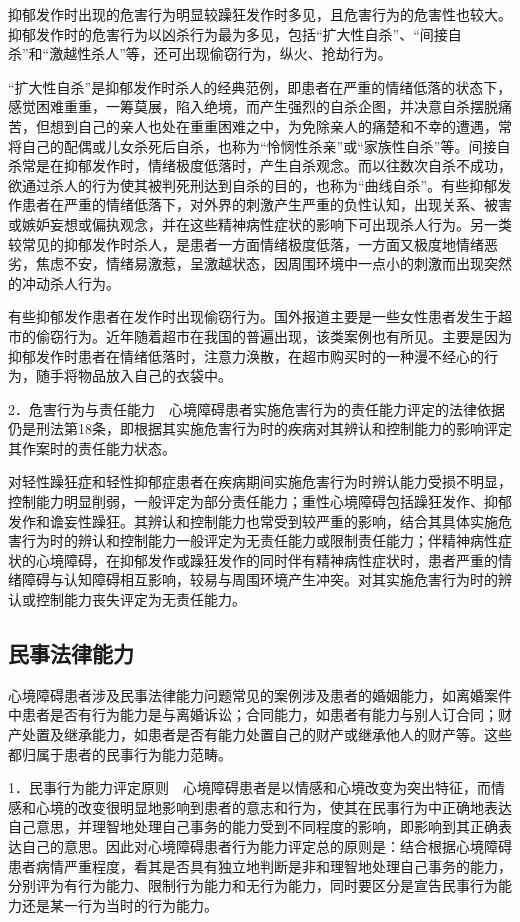 抑郁发作时出现的危害行为明显较躁狂发作时多见，且危害行为的危害性也较大。抑郁发作时的危害行为以凶杀行为最为多见，包括“扩大性自杀”、“间接自杀”和“激越性杀人”等，还可出现偷窃行为，纵火、抢劫行为。

“扩大性自杀”是抑郁发作时杀人的经典范例，即患者在严重的情绪低落的状态下，感觉困难重重，一筹莫展，陷入绝境，而产生强烈的自杀企图，并决意自杀摆脱痛苦，但想到自己的亲人也处在重重困难之中，为免除亲人的痛楚和不幸的遭遇，常将自己的配偶或儿女杀死后自杀，也称为“怜悯性杀亲”或“家族性自杀”等。间接自杀常是在抑郁发作时，情绪极度低落时，产生自杀观念。而以往数次自杀不成功，欲通过杀人的行为使其被判死刑达到自杀的目的，也称为“曲线自杀”。有些抑郁发作患者在严重的情绪低落下，对外界的刺激产生严重的负性认知，出现关系、被害或嫉妒妄想或偏执观念，并在这些精神病性症状的影响下可出现杀人行为。另一类较常见的抑郁发作时杀人，是患者一方面情绪极度低落，一方面又极度地情绪恶劣，焦虑不安，情绪易激惹，呈激越状态，因周围环境中一点小的刺激而出现突然的冲动杀人行为。

有些抑郁发作患者在发作时出现偷窃行为。国外报道主要是一些女性患者发生于超市的偷窃行为。近年随着超市在我国的普遍出现，该类案例也有所见。主要是因为抑郁发作时患者在情绪低落时，注意力涣散，在超市购买时的一种漫不经心的行为，随手将物品放入自己的衣袋中。

2．危害行为与责任能力　心境障碍患者实施危害行为的责任能力评定的法律依据仍是刑法第18条，即根据其实施危害行为时的疾病对其辨认和控制能力的影响评定其作案时的责任能力状态。

对轻性躁狂症和轻性抑郁症患者在疾病期间实施危害行为时辨认能力受损不明显，控制能力明显削弱，一般评定为部分责任能力；重性心境障碍包括躁狂发作、抑郁发作和谵妄性躁狂。其辨认和控制能力也常受到较严重的影响，结合其具体实施危害行为时的辨认和控制能力一般评定为无责任能力或限制责任能力；伴精神病性症状的心境障碍，在抑郁发作或躁狂发作的同时伴有精神病性症状时，患者严重的情绪障碍与认知障碍相互影响，较易与周围环境产生冲突。对其实施危害行为时的辨认或控制能力丧失评定为无责任能力。

\subsection{民事法律能力}

心境障碍患者涉及民事法律能力问题常见的案例涉及患者的婚姻能力，如离婚案件中患者是否有行为能力是与离婚诉讼；合同能力，如患者有能力与别人订合同；财产处置及继承能力，如患者是否有能力处置自己的财产或继承他人的财产等。这些都归属于患者的民事行为能力范畴。

1．民事行为能力评定原则　心境障碍患者是以情感和心境改变为突出特征，而情感和心境的改变很明显地影响到患者的意志和行为，使其在民事行为中正确地表达自己意思，并理智地处理自己事务的能力受到不同程度的影响，即影响到其正确表达自己的意思。因此对心境障碍患者行为能力评定总的原则是：结合根据心境障碍患者病情严重程度，看其是否具有独立地判断是非和理智地处理自己事务的能力，分别评为有行为能力、限制行为能力和无行为能力，同时要区分是宣告民事行为能力还是某一行为当时的行为能力。

